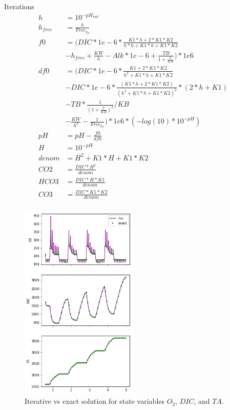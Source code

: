 \documentclass{ruthesis}
\begin{document}
Iterations
\begin{align*}
h 			&=  10^{-pH_{init}}	\nonumber                              \\
h_{free} 	&=  \frac{h}{Free_{2_T}}	 \nonumber \\
f0 			&= (  DIC*1e-6*\frac{K1*h+2*K1*K2}{h*h+K1*h+K1*K2}    \nonumber\\
			&  - h_{free} + \frac{KW}{h} - Alk*1e-6 + \frac{TB}{1+\frac{h}{KB}} )*1e6 \nonumber  \\
df0 		&= (  DIC*1e-6*\frac{K1 +2*K1*K2}{h^2+K1*h+K1*K2}  \nonumber\\
			&  -DIC*1e-6*\frac{(K1*h+2*K1*K2)}{(h^2+K1*h+K1*K2)^2}*(2*h+K1)  \nonumber\\
			&  -TB *\frac{1}{(1+ \frac{h}{KB})^2} / KB             \nonumber             \\
			&  -\frac{KW}{h^2} - \frac{1}{Free_{2_T}} )*1e6  * (-log(10)*10^{-pH}) \nonumber \\
pH 			&= pH - \frac{f0}{df0} \nonumber                              \\
H 			&= 10^{-pH} \nonumber                              \\
denom 		&= H^2+K1*H+K1*K2 \nonumber                              \\
CO2  		&= \frac{DIC*H^2}{denom} \nonumber                              \\
HCO3 		&= \frac{DIC*H *K1}{denom} \nonumber                              \\
CO3  		&= \frac{DIC*K1*K2}{denom}      \nonumber \\                         
\end{align*}




\begin{figure}
	\centerline{\includegraphics[width=0.5\textwidth]{images_microalgae/plots/iterative_states}}
	\caption[.]{Iterative vs exact solution for state variables $O_2$, $DIC$, and $TA$.}
	\label{fig:iterative_states}
\end{figure}
\end{document}
